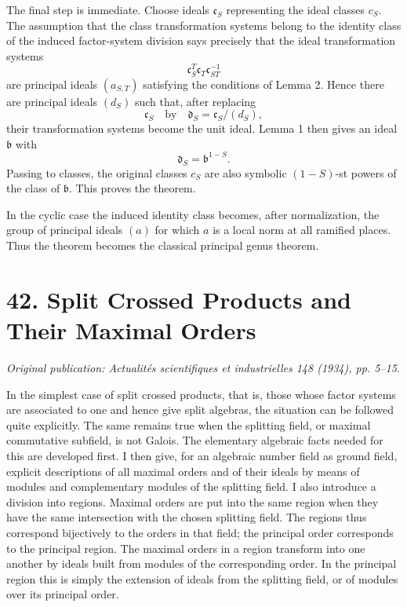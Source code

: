 \documentclass[12pt]{article}
\begin{document}
The final step is immediate. Choose ideals \(\mathfrak c_S\) representing the ideal classes \(c_S\). The assumption that the class transformation systems belong to the identity class of the induced factor-system division says precisely that the ideal transformation systems
\[
  \mathfrak c_S^T\mathfrak c_T\mathfrak c_{ST}^{-1}
\]
are principal ideals \((a_{S,T})\) satisfying the conditions of Lemma 2. Hence there are principal ideals \((d_S)\) such that, after replacing
\[
  \mathfrak c_S\quad\text{by}\quad \mathfrak d_S=\mathfrak c_S/(d_S),
\]
their transformation systems become the unit ideal. Lemma 1 then gives an ideal \(\mathfrak b\) with
\[
  \mathfrak d_S=\mathfrak b^{1-S}.
\]
Passing to classes, the original classes \(c_S\) are also symbolic \((1-S)\)-st powers of the class of \(\mathfrak b\). This proves the theorem.

In the cyclic case the induced identity class becomes, after normalization, the group of principal ideals \((a)\) for which \(a\) is a local norm at all ramified places. Thus the theorem becomes the classical principal genus theorem.

\clearpage
\section{42. Split Crossed Products and Their Maximal Orders}

\textit{Original publication: Actualités scientifiques et industrielles 148 (1934), pp. 5--15.}

In the simplest case of split crossed products, that is, those whose factor systems are associated to one and hence give split algebras, the situation can be followed quite explicitly. The same remains true when the splitting field, or maximal commutative subfield, is not Galois. The elementary algebraic facts needed for this are developed first. I then give, for an algebraic number field as ground field, explicit descriptions of all maximal orders and of their ideals by means of modules and complementary modules of the splitting field. I also introduce a division into regions. Maximal orders are put into the same region when they have the same intersection with the chosen splitting field. The regions thus correspond bijectively to the orders in that field; the principal order corresponds to the principal region. The maximal orders in a region transform into one another by ideals built from modules of the corresponding order. In the principal region this is simply the extension of ideals from the splitting field, or of modules over its principal order.
\end{document}
